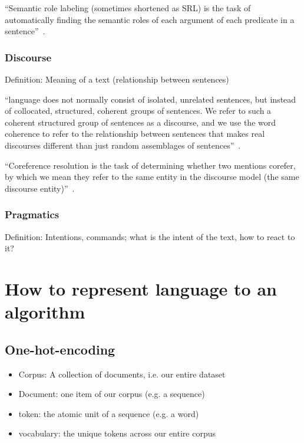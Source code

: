 \documentclass[11pt]{article}
\begin{document}
``Semantic role labeling (sometimes shortened as SRL) is the task of automatically finding the semantic roles of each argument of each predicate in a sentence''~\cite{book-speech-and-language-processing}.

\subsubsection{Discourse}

Definition: Meaning of a text (relationship between sentences)

``language does not normally consist of isolated, unrelated sentences, but instead of collocated, structured, coherent groups of sentences. We refer to such a coherent structured group of sentences as a discourse, and we use the word coherence to refer to the relationship between sentences that makes real discourses different than just random assemblages of sentences''~\cite{book-speech-and-language-processing}.

``Coreference resolution is the task of determining whether two mentions corefer, by which we mean they refer to the same entity in the discourse model (the same discourse entity)''~\cite{book-speech-and-language-processing}.

\subsubsection{Pragmatics}

Definition: Intentions, commands; what is the intent of the text, how to react to it?

\section{How to represent language to an algorithm}

\subsection{One-hot-encoding}

\begin{itemize}
    \item Corpus: A collection of documents, i.e. our entire dataset
    \item Document: one item of our corpus (e.g. a sequence)
    \item token: the atomic unit of a sequence (e.g. a word)
    \item vocabulary: the unique tokens across our entire corpus
\end{itemize}
\end{document}
